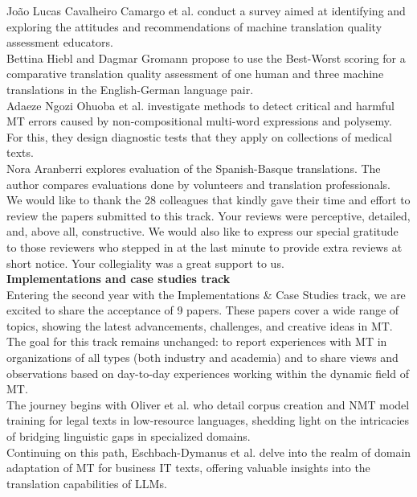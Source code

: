 João Lucas Cavalheiro Camargo et al. conduct a survey aimed at identifying and exploring the attitudes and recommendations of machine translation quality assessment educators.
\\

Bettina Hiebl and Dagmar Gromann propose to use the Best-Worst scoring for a comparative translation quality assessment of one human and three machine translations in the English-German language pair.
\\

Adaeze Ngozi Ohuoba et al. investigate methods to detect critical and harmful MT errors caused by non-compositional multi-word expressions and polysemy. For this, they design diagnostic tests that they apply on collections of medical texts.
\\

Nora Aranberri explores evaluation of the Spanish-Basque translations. The author compares evaluations done by volunteers and translation professionals.
\\

We would like to thank the 28 colleagues that kindly gave their time and effort to review the papers submitted to this track. Your reviews were perceptive, detailed, and, above all, constructive. We would also like to express our special gratitude to those reviewers who stepped in at the last minute to provide extra reviews at short notice. Your collegiality was a great support to us.
\\

{\bf Implementations and case studies track} 
\\

Entering the second year with the Implementations \& Case Studies track, we are excited to share the acceptance of 9 papers. These papers cover a wide range of topics, showing the latest advancements, challenges, and creative ideas in MT. The goal for this track remains unchanged: to report experiences with MT in organizations of all types (both industry and academia) and to share views and observations based on day-to-day experiences working within the dynamic field of MT.
\\

The journey begins with Oliver et al. who detail corpus creation and NMT model training for legal texts in low-resource languages, shedding light on the intricacies of bridging linguistic gaps in specialized domains.
\\

Continuing on this path, Eschbach-Dymanus et al. delve into the realm of domain adaptation of MT for business IT texts, offering valuable insights into the translation capabilities of LLMs.
\\

